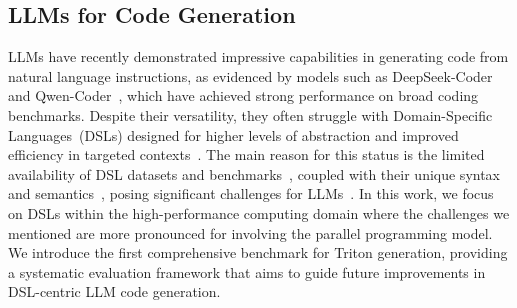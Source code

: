 \subsection{LLMs for Code Generation}
LLMs have recently demonstrated impressive capabilities in generating code from natural language instructions, as evidenced by models such as DeepSeek-Coder~\cite{guo2024deepseek,zhu2024deepseek} and Qwen-Coder~\cite{hui2024qwen2}, which have achieved strong performance on broad coding benchmarks. 
Despite their versatility, they often struggle with Domain-Specific Languages~(DSLs) designed for higher levels of abstraction and improved efficiency in targeted contexts~\cite{wkasowski2023domain}. 
The main reason for this status is the limited availability of DSL datasets and benchmarks~\cite{cassano2024knowledge, pujar2023automated}, coupled with their unique syntax and semantics~\cite{pujar2023automated}, posing significant challenges for LLMs~\cite{buscemi2023comparative}.
In this work, we focus on DSLs within the high-performance computing domain where the challenges we mentioned are more pronounced for involving the parallel programming model. 
We introduce the first comprehensive benchmark for Triton generation, providing a systematic evaluation framework that aims to guide future improvements in DSL-centric LLM code generation.